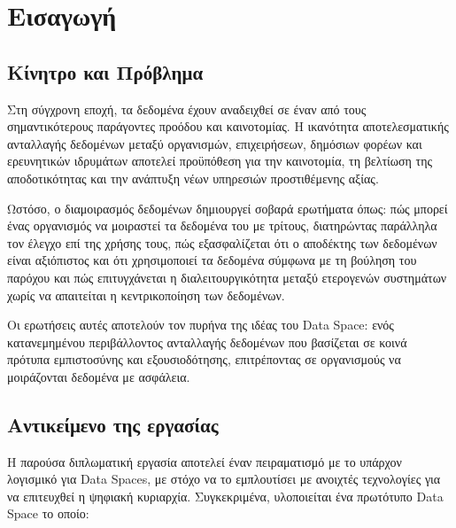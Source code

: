 \chapter{Εισαγωγή}
\label{ch:introduction}

\section{Κίνητρο και Πρόβλημα}
\label{sec:motivation}

Στη σύγχρονη εποχή, τα δεδομένα έχουν αναδειχθεί σε έναν από
τους σημαντικότερους παράγοντες προόδου και καινοτομίας. Η ικανότητα
αποτελεσματικής ανταλλαγής δεδομένων μεταξύ οργανισμών, επιχειρήσεων,
δημόσιων φορέων και ερευνητικών ιδρυμάτων αποτελεί προϋπόθεση για την
καινοτομία, τη βελτίωση της αποδοτικότητας και την ανάπτυξη νέων υπηρεσιών
προστιθέμενης αξίας.

Ωστόσο, ο διαμοιρασμός δεδομένων δημιουργεί σοβαρά ερωτήματα όπως:
πώς μπορεί ένας οργανισμός να μοιραστεί τα δεδομένα του με
τρίτους, διατηρώντας παράλληλα τον έλεγχο επί της χρήσης τους, πώς
εξασφαλίζεται ότι ο αποδέκτης των δεδομένων είναι αξιόπιστος και ότι χρησιμοποιεί τα
δεδομένα σύμφωνα με τη βούληση του παρόχου και πώς επιτυγχάνεται η
διαλειτουργικότητα μεταξύ ετερογενών συστημάτων χωρίς να απαιτείται η
κεντρικοποίηση των δεδομένων.

Οι ερωτήσεις αυτές αποτελούν τον πυρήνα της ιδέας του \textlatin{Data
Space}: ενός κατανεμημένου περιβάλλοντος ανταλλαγής δεδομένων που βασίζεται σε
κοινά πρότυπα εμπιστοσύνης και εξουσιοδότησης, επιτρέποντας σε οργανισμούς να
μοιράζονται δεδομένα με ασφάλεια.

\section{Αντικείμενο της εργασίας}
\label{sec:objective}

Η παρούσα διπλωματική εργασία αποτελεί έναν πειραματισμό με το υπάρχον λογισμικό για
\textlatin{Data Spaces}, με στόχο να το εμπλουτίσει με ανοιχτές τεχνολογίες για να επιτευχθεί η 
ψηφιακή κυριαρχία. Συγκεκριμένα, υλοποιείται ένα πρωτότυπο \textlatin{Data Space} το οποίο:

